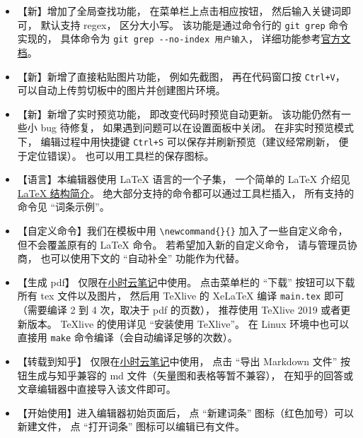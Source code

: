 \begin{itemize}
\item 【新】增加了全局查找功能， 在菜单栏上点击相应按钮， 然后输入关键词即可， 默认支持 regex， 区分大小写。 该功能是通过命令行的 \verb|git grep| 命令实现的， 具体命令为 \verb|git grep --no-index 用户输入|， 详细功能参考\href{https://git-scm.com/docs/git-grep}{官方文档}。
\item 【新】新增了直接粘贴图片功能， 例如先截图， 再在代码窗口按 \verb|Ctrl+V|， 可以自动上传剪切板中的图片并创建图片环境。
\item 【新】新增了实时预览功能， 即改变代码时预览自动更新。 该功能仍然有一些小 bug 待修复， 如果遇到问题可以在设置面板中关闭。 在非实时预览模式下， 编辑过程中用快捷键 \verb|Ctrl+S| 可以保存并刷新预览（建议经常刷新， 便于定位错误）。 也可以用工具栏的保存图标。
\item 【语言】本编辑器使用 LaTeX 语言的一个子集， 一个简单的 LaTeX 介绍见 \href{https://wuli.wiki/online/latxIn.html}{LaTeX 结构简介}。 绝大部分支持的命令都可以通过工具栏插入， 所有支持的命令见 “词条示例”。
\item 【自定义命令】我们在模板中用 \verb|\newcommand{}{}| 加入了一些自定义命令， 但不会覆盖原有的 LaTeX 命令。 若希望加入新的自定义命令， 请与管理员协商， 也可以使用下文的 “自动补全” 功能作为代替。
\item 【生成 pdf】 仅限在\href{http://wuli.wiki/note/}{小时云笔记}中使用。 点击菜单栏的 “下载” 按钮可以下载所有 tex 文件以及图片， 然后用 TeXlive 的 XeLaTeX 编译 \verb|main.tex| 即可（需要编译 2 到 4 次，取决于 pdf 的页数）， 推荐使用 TeXlive 2019 或者更新版本。 TeXlive 的使用详见 “安装使用 TeXlive”。 在 Linux 环境中也可以直接用 \verb|make| 命令编译（会自动编译足够的次数）。
\item 【转载到知乎】 仅限在\href{http://wuli.wiki/note/}{小时云笔记}中使用， 点击 “导出 Markdown 文件” 按钮生成与知乎兼容的 md 文件（矢量图和表格等暂不兼容）， 在知乎的回答或文章编辑器中直接导入该文件即可。
\item 【开始使用】进入编辑器初始页面后， 点 “新建词条” 图标（红色加号）可以新建文件， 点 “打开词条” 图标可以编辑已有文件。

\end{itemize}

